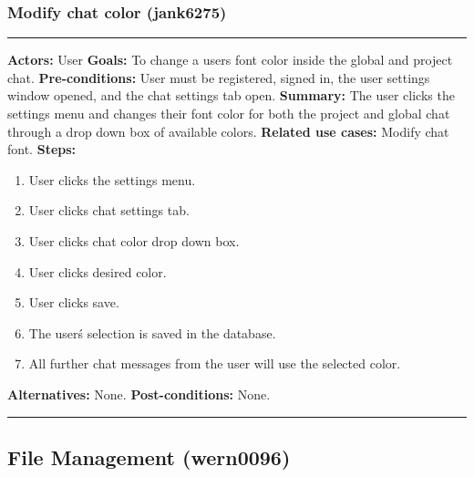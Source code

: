 \documentclass[11pt]{report}
\begin{document}
\subsubsection{Modify chat color (jank6275)}
\vspace{2pt}
\hrule
\vspace{8pt}
 \textbf{Actors:} User \newline
\textbf{Goals:} To change a users font color inside the global and project chat. \newline
 \textbf{Pre-conditions:} User must be registered, signed in, the user settings window opened, and the chat settings tab open.  \newline
 \textbf{Summary:} The user clicks the settings menu and changes their font color for both the project and global chat through a drop down box of available colors. \newline
\textbf{Related use cases:} Modify chat font. \newline
\textbf{Steps:} \begin{enumerate}
  \item User clicks the settings menu.
  \item User clicks chat settings tab.
  \item User clicks chat color drop down box.
  \item User clicks desired color.
  \item User clicks save.
  \item The user\'s selection is saved in the database.
  \item All further chat messages from the user will use the selected color.
 \end{enumerate}
 \textbf{Alternatives:} None. \newline
 \textbf{Post-conditions:} None. \newline
\vspace{8pt}
\hrule

\newpage

\subsection{File Management (wern0096)}
\end{document}
